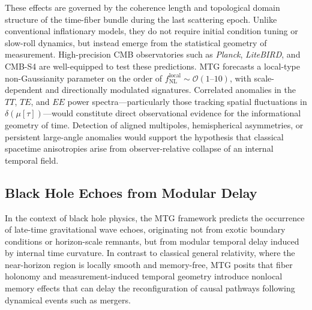 \documentclass[11pt]{article}
\begin{document}
These effects are governed by the coherence length and topological domain structure of the time-fiber bundle during the last scattering epoch. Unlike conventional inflationary models, they do not require initial condition tuning or slow-roll dynamics, but instead emerge from the statistical geometry of measurement. High-precision CMB observatories such as \textit{Planck}, \textit{LiteBIRD}, and CMB-S4 are well-equipped to test these predictions. MTG forecasts a local-type non-Gaussianity parameter on the order of \( f_{\mathrm{NL}}^{\mathrm{local}} \sim \mathcal{O}(1\text{--}10) \), with scale-dependent and directionally modulated signatures. Correlated anomalies in the \( TT \), \( TE \), and \( EE \) power spectra—particularly those tracking spatial fluctuations in \( \delta(\mu[\tau]) \)—would constitute direct observational evidence for the informational geometry of time. Detection of aligned multipoles, hemispherical asymmetries, or persistent large-angle anomalies would support the hypothesis that classical spacetime anisotropies arise from observer-relative collapse of an internal temporal field.

\subsection{Black Hole Echoes from Modular Delay}

In the context of black hole physics, the MTG framework predicts the occurrence of late-time gravitational wave echoes, originating not from exotic boundary conditions or horizon-scale remnants, but from modular temporal delay induced by internal time curvature. In contrast to classical general relativity, where the near-horizon region is locally smooth and memory-free, MTG posits that fiber holonomy and measurement-induced temporal geometry introduce nonlocal memory effects that can delay the reconfiguration of causal pathways following dynamical events such as mergers.
\end{document}
